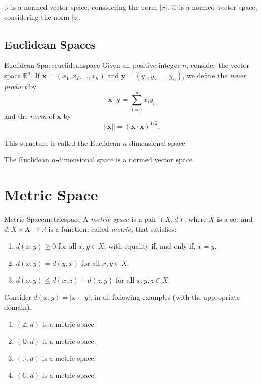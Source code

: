 \begin{exmp}{}{}
	\(\mathbb{R}\) is a normed vector space, considering the norm \(|x|\).
	\(\mathbb{C}\) is a normed vector space, considering the norm \(|z|\).
\end{exmp}

\subsection{Euclidean Spaces}

\begin{defn}{Euclidean Space}{euclideanspace}
	Given an positive integer \(n\), consider the vector space \(\mathbb{R}^n\).
	If \(\mathbf x = (x_1, x_2, \dots, x_n)\) and \(\mathbf y = (y_1, y_2, \dots, y_n)\), we define the \emph{inner product} by \[
		\mathbf x \cdot \mathbf y = \sum_{i=1}^n x_iy_i
	\]
	and the \emph{norm} of \(\mathbf x\) by \[
		||\mathbf x|| = (\mathbf x \cdot \mathbf x)^{1/2}.
	\]

	This structure is called the Euclidean \(n\)-dimensional space.
\end{defn}

\begin{prop}{}{}
	The Euclidean \(n\)-dimensional space is a normed vector space.
\end{prop}

\section{Metric Space}

\begin{defn}{Metric Space}{metricspace}
	A \emph{metric space} is a pair \((X, d)\), where \(X\) is a set and \(d\colon X \times X \to \mathbb{R}\) is a function, called \emph{metric}, that satisfies:
	\begin{enumerate}[label = \textbullet]
		\item \(d(x, y) \geq 0\) for all \(x, y \in X\); with equality if, and only if, \(x = y\).
		\item \(d(x, y) = d(y, x)\) for all \(x, y \in X\). 
		\item \(d(x, y) \leq d(x, z) + d(z, y)\) for all \(x, y, z \in X\).
	\end{enumerate}
\end{defn}

\begin{exmp}{}{}
	Consider \(d(x, y) = |x - y|\), in all following examples (with the appropriate domain).
	\begin{enumerate}[label = \textbullet]
		\item \((\mathbb{Z}, d)\) is a metric space.
		\item \((\mathbb{Q}, d)\) is a metric space.
		\item \((\mathbb{R}, d)\) is a metric space.
		\item \((\mathbb{C}, d)\) is a metric space.
	\end{enumerate}
\end{exmp}

